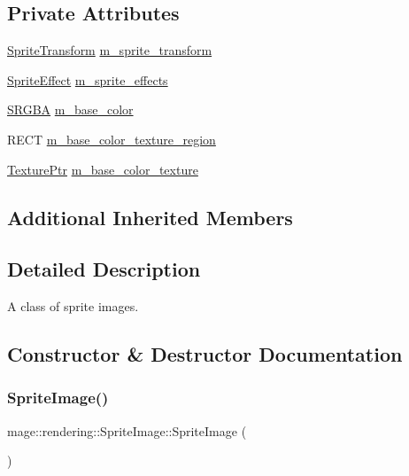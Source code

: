 \subsection*{Private Attributes}
\begin{DoxyCompactItemize}
\item 
\hyperlink{classmage_1_1_sprite_transform}{Sprite\+Transform} \hyperlink{classmage_1_1rendering_1_1_sprite_image_a7985369471809a6efcdeb8a265510b7a}{m\+\_\+sprite\+\_\+transform}
\item 
\hyperlink{namespacemage_1_1rendering_a4dbc3536c87b906f1d41d863ec458e78}{Sprite\+Effect} \hyperlink{classmage_1_1rendering_1_1_sprite_image_a25891d2cfd1edd3dc86c0bc82700cad2}{m\+\_\+sprite\+\_\+effects}
\item 
\hyperlink{structmage_1_1_s_r_g_b_a}{S\+R\+G\+BA} \hyperlink{classmage_1_1rendering_1_1_sprite_image_a1d7c771b5d2a6665260b528dd426ff43}{m\+\_\+base\+\_\+color}
\item 
R\+E\+CT \hyperlink{classmage_1_1rendering_1_1_sprite_image_a18de0a4473e2bfee074cd152d1ba2c3e}{m\+\_\+base\+\_\+color\+\_\+texture\+\_\+region}
\item 
\hyperlink{namespacemage_1_1rendering_a6f3ae54f825328465b0cdde0f0de4a36}{Texture\+Ptr} \hyperlink{classmage_1_1rendering_1_1_sprite_image_a1b68c232550bfc55aa794fcffbeab489}{m\+\_\+base\+\_\+color\+\_\+texture}
\end{DoxyCompactItemize}
\subsection*{Additional Inherited Members}


\subsection{Detailed Description}
A class of sprite images. 

\subsection{Constructor \& Destructor Documentation}
\hypertarget{classmage_1_1rendering_1_1_sprite_image_af49f06e0de889dbfd2db264d9e07fc20}{}\label{classmage_1_1rendering_1_1_sprite_image_af49f06e0de889dbfd2db264d9e07fc20} 
\subsubsection{\texorpdfstring{Sprite\+Image()}{SpriteImage()}\hspace{0.1cm}{\footnotesize\ttfamily [1/3]}}
{\footnotesize\ttfamily mage\+::rendering\+::\+Sprite\+Image\+::\+Sprite\+Image (\begin{DoxyParamCaption}{ }\end{DoxyParamCaption})\hspace{0.3cm}{\ttfamily [noexcept]}}

